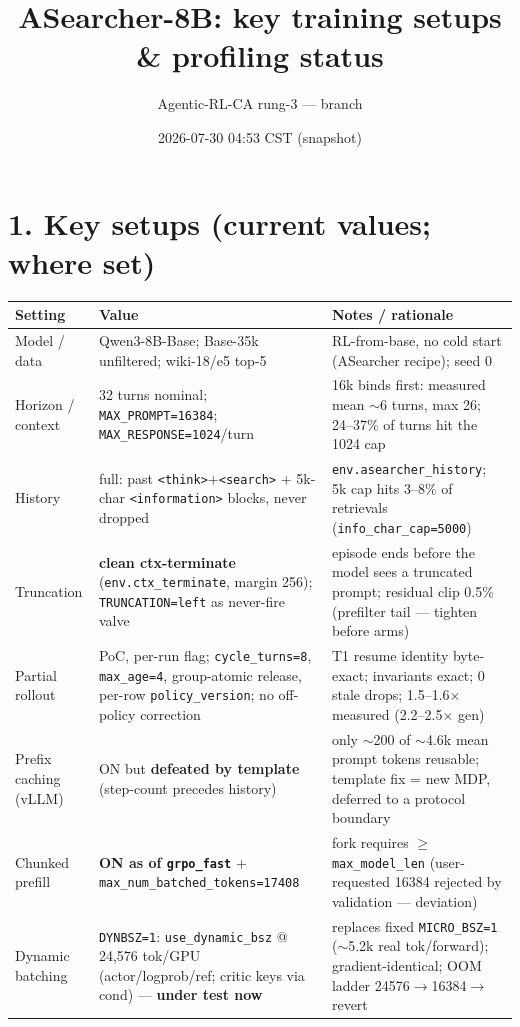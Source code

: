 \documentclass[10pt]{article}
\title{\vspace{-1.4em}ASearcher-8B: key training setups \& profiling status\vspace{-0.5em}}
\author{Agentic-RL-CA rung-3 --- branch \code{sync-partial-rollout-poc}}
\date{2026-07-30 04:53 CST (snapshot)}
\newcommand{\code}[1]{\texttt{\small #1}}
\begin{document}
\maketitle\vspace{-1.8em}

\section*{1. Key setups (current values; where set)}
\small
\begin{tabular}{p{3.4cm}p{4.3cm}p{8.2cm}}
\toprule
\textbf{Setting} & \textbf{Value} & \textbf{Notes / rationale}\\
\midrule
Model / data & Qwen3-8B-Base; Base-35k unfiltered; wiki-18/e5 top-5 & RL-from-base, no cold start (ASearcher recipe); seed 0\\
Horizon / context & 32 turns nominal; \code{MAX\_PROMPT=16384}; \code{MAX\_RESPONSE=1024}/turn & 16k binds first: measured mean $\sim$6 turns, max 26; 24--37\% of turns hit the 1024 cap\\
History & full: past \code{<think>}+\code{<search>} + 5k-char \code{<information>} blocks, never dropped & \code{env.asearcher\_history}; 5k cap hits 3--8\% of retrievals (\code{info\_char\_cap=5000})\\
Truncation & \textbf{clean ctx-terminate} (\code{env.ctx\_terminate}, margin 256); \code{TRUNCATION=left} as never-fire valve & episode ends before the model sees a truncated prompt; residual clip 0.5\% (prefilter tail --- tighten before arms)\\
Partial rollout & PoC, per-run flag; \code{cycle\_turns=8}, \code{max\_age=4}, group-atomic release, per-row \code{policy\_version}; no off-policy correction & T1 resume identity byte-exact; invariants exact; 0 stale drops; 1.5--1.6$\times$ measured (2.2--2.5$\times$ gen)\\
Prefix caching (vLLM) & ON but \textbf{defeated by template} (step-count precedes history) & only $\sim$200 of $\sim$4.6k mean prompt tokens reusable; template fix = new MDP, deferred to a protocol boundary\\
Chunked prefill & \textbf{ON as of \code{grpo\_fast}} + \code{max\_num\_batched\_tokens=17408} & fork requires $\ge$ \code{max\_model\_len} (user-requested 16384 rejected by validation --- deviation)\\
Dynamic batching & \code{DYNBSZ=1}: \code{use\_dynamic\_bsz} @ 24{,}576 tok/GPU (actor/logprob/ref; critic keys via cond) --- \textbf{under test now} & replaces fixed \code{MICRO\_BSZ=1} ($\sim$5.2k real tok/forward); gradient-identical; OOM ladder 24576$\to$16384$\to$revert\\

\end{tabular}
\end{document}
